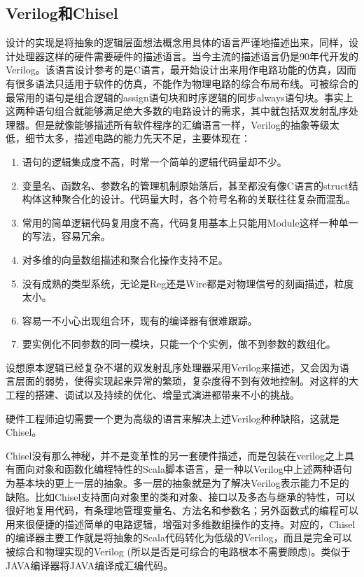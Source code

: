\subsection{Verilog和Chisel}

设计的实现是将抽象的逻辑层面想法概念用具体的语言严谨地描述出来，同样，设计处理器这样的硬件需要硬件的描述语言。当今主流的描述语言仍是90年代开发的Verilog。该语言设计参考的是C语言，最开始设计出来用作电路功能的仿真，因而有很多语法只适用于软件的仿真，不能作为物理电路的综合布局布线。可被综合的最常用的语句是组合逻辑的assign语句块和时序逻辑的同步always语句块。事实上这两种语句组合就能够满足绝大多数的电路设计的需求，其中就包括双发射乱序处理器。但是就像能够描述所有软件程序的汇编语言一样，Verilog的抽象等级太低，细节太多，描述电路的能力先天不足，主要体现在：
\begin{enumerate}[label=(\alph*)]
	\item 语句的逻辑集成度不高，时常一个简单的逻辑代码量却不少。
	\item 变量名、函数名、参数名的管理机制原始落后，甚至都没有像C语言的struct结构体这种聚合化的设计。代码量大时，各个符号名称的关联往往复杂而混乱。
	\item 常用的简单逻辑代码复用度不高，代码复用基本上只能用Module这样一种单一的写法，容易冗余。
	\item 对多维的向量数组描述和聚合化操作支持不足。
	\item 没有成熟的类型系统，无论是Reg还是Wire都是对物理信号的刻画描述，粒度太小。
	\item 容易一不小心出现组合环，现有的编译器有很难跟踪。
	\item 要实例化不同参数的同一模块，只能一个个实例，做不到参数的数组化。
\end{enumerate}

设想原本逻辑已经复杂不堪的双发射乱序处理器采用Verilog来描述，又会因为语言层面的弱势，使得实现起来异常的繁琐，复杂度得不到有效地控制。对这样的大工程的搭建、调试以及持续的优化、增量式演进都带来不小的挑战。

硬件工程师迫切需要一个更为高级的语言来解决上述Verilog种种缺陷，这就是Chisel。

Chisel没有那么神秘，并不是变革性的另一套硬件描述，而是包装在verilog之上具有面向对象和函数化编程特性的Scala脚本语言，是一种以Verilog中上述两种语句为基本块的更上一层的抽象。多一层的抽象就是为了解决Verilog表示能力不足的缺陷。比如Chisel支持面向对象里的类和对象、接口以及多态与继承的特性，可以很好地复用代码，有条理地管理变量名、方法名和参数名；另外函数式的编程可以用来很便捷的描述简单的电路逻辑，增强对多维数组操作的支持。对应的，Chisel的编译器主要工作就是将抽象的Scala代码转化为低级的Verilog，而且是完全可以被综合和物理实现的Verilog (所以是否是可综合的电路根本不需要顾虑)。类似于JAVA编译器将JAVA编译成汇编代码。

